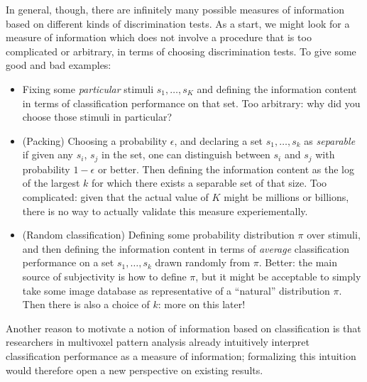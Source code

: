 \documentclass[12pt]{article}
\begin{document}
In general, though, there are infinitely many possible measures of
information based on different kinds of discrimination tests.  As a
start, we might look for a measure of information which does not
involve a procedure that is too complicated or arbitrary, in terms of
choosing discrimination tests.  To give some good and bad examples:
\begin{itemize}
\item Fixing some \emph{particular} stimuli $s_1,\hdots ,s_K$ and defining the information content in terms of classification performance on that set.  Too arbitrary: why did you choose those stimuli in particular?
\item (Packing) Choosing a probability $\epsilon$, and declaring a set $s_1,\hdots, s_k$ as \emph{separable} if given any $s_i$, $s_j$ in the set, one can distinguish between $s_i$ and $s_j$ with probability $1-\epsilon$ or better.  Then defining the information content as the log of the largest $k$ for which there exists a separable set of that size.  Too complicated: given that the actual value of $K$ might be millions or billions, there is no way to actually validate this measure experiementally.
\item (Random classification) Defining some probability distribution $\pi$ over stimuli, and then defining the information content in terms of \emph{average} classification performance on a set $s_1,\hdots, s_k$ drawn randomly from $\pi$.  Better: the main source of subjectivity is how to define $\pi$, but it might be acceptable to simply take some image database as representative of a ``natural'' distribution $\pi$.  Then there is also a choice of $k$: more on this later!
\end{itemize}

Another reason to motivate a notion of information based on
classification is that researchers in multivoxel pattern analysis
already intuitively interpret classification performance as a measure
of information; formalizing this intuition would therefore open a new
perspective on existing results.
\end{document}
